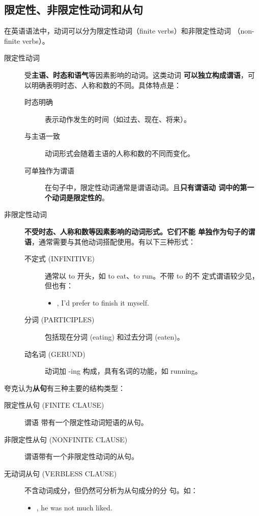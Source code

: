 \subsection{限定性、非限定性动词和从句}
\label{subsec:iffinite}

在英语语法中，动词可以分为限定性动词（finite verbs）和非限定性动词
（non-finite verbs）。
\begin{description}
\item[限定性动词] 受\textbf{主语、时态和语气}等因素影响的动词。这类动词
  \textbf{可以独立构成谓语}，可以明确表明时态、人称和数的不同。具体特点是：
  \begin{description}
  \item[时态明确] 表示动作发生的时间（如过去、现在、将来）。
  \item[与主语一致] 动词形式会随着主语的人称和数的不同而变化。
  \item[可单独作为谓语] 在句子中，限定性动词通常是谓语动词。且\textbf{只有谓语动
      词中的第一个动词是限定性的}。
  \end{description}


\item[非限定性动词] \textbf{不受时态、人称和数等因素影响的动词形式。它们不能
    单独作为句子的谓语}，通常需要与其他动词搭配使用。有以下三种形式：
  \begin{description}
  \item[不定式 (INFINITIVE)] 通常以 to 开头，如 to eat、to run。不带 to 的不
    定式谓语较少见，但也有：
    \begin{itemize}
    \item {}, I'd prefer to finish it myself.
    \end{itemize}
  \item[分词 (PARTICIPLES)] 包括现在分词 (eating) 和过去分词 (eaten)。
  \item[动名词 (GERUND)] 动词加 -ing 构成，具有名词的功能，如 running。
  \end{description}

\end{description}


夸克认为\textbf{从句}有三种主要的结构类型：
\begin{description}
\item[限定性从句 (FINITE CLAUSE)]  谓语
  带有一个限定性动词短语的从句。
\item[非限定性从句 (NONFINITE CLAUSE)]  谓语带有一个非限定性动词的从句。
\item[无动词从句 (VERBLESS CLAUSE)] 不含动词成分，但仍然可分析为从句成分的分
  句。如：
  \begin{itemize}
  \item {}  , he was not much liked.
  \end{itemize}
\end{description}

